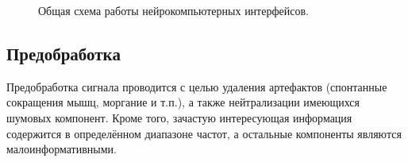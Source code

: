 \documentclass[12pt,fleqn]{article}
\begin{document}
	\begin{figure}[H]
	\caption{Общая схема работы нейрокомпьютерных интерфейсов.}
	\label{bci}
	\end{figure}


	\subsection{Предобработка}
	\par Предобработка сигнала проводится с целью удаления артефактов (спонтанные сокращения мышц, моргание и т.п.), а также нейтрализации имеющихся шумовых компонент. Кроме того, зачастую интересующая информация содержится в определённом диапазоне частот, а остальные компоненты являются малоинформативными.
\end{document}
